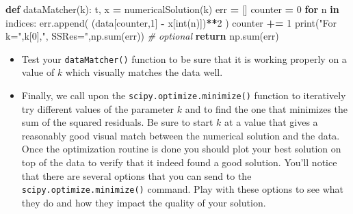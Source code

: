 \documentclass[
]{book}
\newenvironment{Shaded}{\begin{snugshade}}{\end{snugshade}}
\newcommand{\BuiltInTok}[1]{#1}
\newcommand{\CommentTok}[1]{\textcolor[rgb]{0.56,0.35,0.01}{\textit{#1}}}
\newcommand{\ControlFlowTok}[1]{\textcolor[rgb]{0.13,0.29,0.53}{\textbf{#1}}}
\newcommand{\DecValTok}[1]{\textcolor[rgb]{0.00,0.00,0.81}{#1}}
\newcommand{\KeywordTok}[1]{\textcolor[rgb]{0.13,0.29,0.53}{\textbf{#1}}}
\newcommand{\NormalTok}[1]{#1}
\newcommand{\OperatorTok}[1]{\textcolor[rgb]{0.81,0.36,0.00}{\textbf{#1}}}
\newcommand{\StringTok}[1]{\textcolor[rgb]{0.31,0.60,0.02}{#1}}
\theoremstyle{definition}
\theoremstyle{definition}
\theoremstyle{definition}
\theoremstyle{remark}
\begin{document}
\begin{Shaded}
\begin{Highlighting}[]
\KeywordTok{def}\NormalTok{ dataMatcher(k):}
\NormalTok{    t, x }\OperatorTok{=}\NormalTok{ numericalSolution(k)}
\NormalTok{    err }\OperatorTok{=}\NormalTok{ []}
\NormalTok{    counter }\OperatorTok{=} \DecValTok{0}
    \ControlFlowTok{for}\NormalTok{ n }\KeywordTok{in}\NormalTok{ indices:}
\NormalTok{        err.append( (data[counter,}\DecValTok{1}\NormalTok{] }\OperatorTok{{-}}\NormalTok{ x[}\BuiltInTok{int}\NormalTok{(n)])}\OperatorTok{**}\DecValTok{2}\NormalTok{ )}
\NormalTok{        counter }\OperatorTok{+=} \DecValTok{1}
    \BuiltInTok{print}\NormalTok{(}\StringTok{"For k="}\NormalTok{,k[}\DecValTok{0}\NormalTok{],}\StringTok{",  SSRes="}\NormalTok{,np.}\BuiltInTok{sum}\NormalTok{(err)) }\CommentTok{\# optional}
    \ControlFlowTok{return}\NormalTok{ np.}\BuiltInTok{sum}\NormalTok{(err)}
\end{Highlighting}
\end{Shaded}

\begin{itemize}
\item
  Test your \texttt{dataMatcher()} function to be sure that it is working properly on a value of \(k\) which visually matches the data well.
\item
  Finally, we call upon the \texttt{scipy.optimize.minimize()} function to iteratively try different values of the parameter \(k\) and to find the one that minimizes the sum of the squared residuals. Be sure to start \(k\) at a value that gives a reasonably good visual match between the numerical solution and the data. Once the optimization routine is done you should plot your best solution on top of the data to verify that it indeed found a good solution. You'll notice that there are several options that you can send to the \texttt{scipy.optimize.minimize()} command. Play with these options to see what they do and how they impact the quality of your solution.
\end{itemize}
\end{document}
